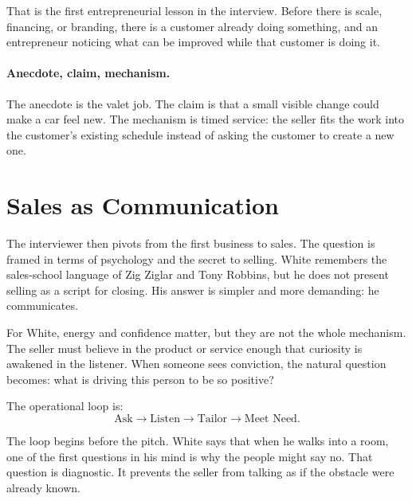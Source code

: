 That is the first entrepreneurial lesson in the interview. Before there is scale, financing, or branding, there is a customer already doing something, and an entrepreneur noticing what can be improved while that customer is doing it.

\paragraph{Anecdote, claim, mechanism.}
The anecdote is the valet job. The claim is that a small visible change could make a car feel new. The mechanism is timed service: the seller fits the work into the customer's existing schedule instead of asking the customer to create a new one.

\section{Sales as Communication}

The interviewer then pivots from the first business to sales. The question is framed in terms of psychology and the secret to selling. White remembers the sales-school language of Zig Ziglar and Tony Robbins, but he does not present selling as a script for closing. His answer is simpler and more demanding: he communicates.

For White, energy and confidence matter, but they are not the whole mechanism. The seller must believe in the product or service enough that curiosity is awakened in the listener. When someone sees conviction, the natural question becomes: what is driving this person to be so positive?

The operational loop is:
\begin{equation}
\text{Ask}\longrightarrow
\text{Listen}\longrightarrow
\text{Tailor}\longrightarrow
\text{Meet Need}.
\end{equation}

The loop begins before the pitch. White says that when he walks into a room, one of the first questions in his mind is why the people might say no. That question is diagnostic. It prevents the seller from talking as if the obstacle were already known.

